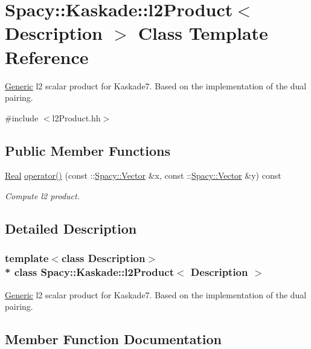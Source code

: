 \hypertarget{classSpacy_1_1Kaskade_1_1l2Product}{}\section{Spacy\+:\+:Kaskade\+:\+:l2\+Product$<$ Description $>$ Class Template Reference}
\label{classSpacy_1_1Kaskade_1_1l2Product}


\hyperlink{namespaceSpacy_1_1Generic}{Generic} l2 scalar product for Kaskade7. Based on the implementation of the dual pairing.  




{\ttfamily \#include $<$l2\+Product.\+hh$>$}

\subsection*{Public Member Functions}
\begin{DoxyCompactItemize}
\item 
\hyperlink{classSpacy_1_1Real}{Real} \hyperlink{classSpacy_1_1Kaskade_1_1l2Product_a22732c1b32cd7eb8a1792440e7298002}{operator()} (const \+::\hyperlink{classSpacy_1_1Vector}{Spacy\+::\+Vector} \&x, const \+::\hyperlink{classSpacy_1_1Vector}{Spacy\+::\+Vector} \&y) const 
\begin{DoxyCompactList}\small\item\em Compute l2 product. \end{DoxyCompactList}\end{DoxyCompactItemize}


\subsection{Detailed Description}
\subsubsection*{template$<$class Description$>$\\*
class Spacy\+::\+Kaskade\+::l2\+Product$<$ Description $>$}

\hyperlink{namespaceSpacy_1_1Generic}{Generic} l2 scalar product for Kaskade7. Based on the implementation of the dual pairing. 

\subsection{Member Function Documentation}
